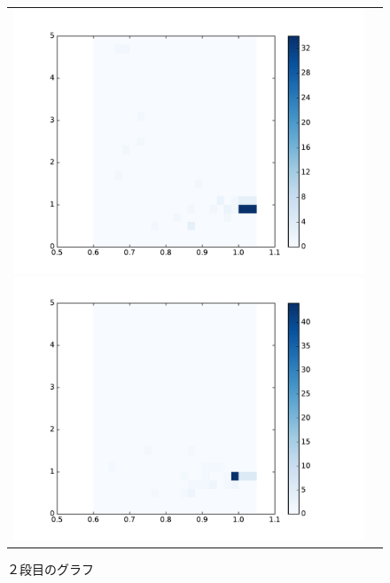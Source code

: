 \documentclass[a4paper,10pt,onecolumn,oneside,openany]{jsbook}
\begin{document}
\begin{figure}[h]
 \begin{tabular}{cc}
 	\begin{minipage}[t]{0.45\hsize}
	 \centering
	 \includegraphics[keepaspectratio, scale = 0.35]{colormap_maze_block_1.pdf}
	 \caption{１段目のグラフ}
	 \label{first_maze_block_color}
	\end{minipage}
        \begin{minipage}[t]{0.45\hsize}
	 \centering
	 \includegraphics[keepaspectratio, scale = 0.35]{colormap_maze_block_2.pdf}
	 \caption{２段目のグラフ}
	 \label{second_maze_block_color}
	\end{minipage}
 \end{tabular}
 \end{figure}
\end{document}
